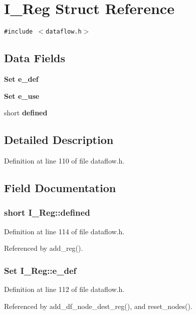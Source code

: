 \section{I\_\-Reg Struct Reference}
\label{structI__Reg}
{\tt \#include $<$dataflow.h$>$}

\subsection*{Data Fields}
\begin{CompactItemize}
\item 
\bf{Set} \bf{e\_\-def}
\item 
\bf{Set} \bf{e\_\-use}
\item 
short \bf{defined}
\end{CompactItemize}


\subsection{Detailed Description}




Definition at line 110 of file dataflow.h.

\subsection{Field Documentation}
\subsubsection{\setlength{\rightskip}{0pt plus 5cm}short \bf{I\_\-Reg::defined}}\label{structI__Reg_5c009d5ee89ae3c6f0c57344e4091b16}




Definition at line 114 of file dataflow.h.

Referenced by add\_\-reg().
\subsubsection{\setlength{\rightskip}{0pt plus 5cm}\bf{Set} \bf{I\_\-Reg::e\_\-def}}\label{structI__Reg_1ac186ebda0f78d461f08d93f2357b11}




Definition at line 112 of file dataflow.h.

Referenced by add\_\-df\_\-node\_\-dest\_\-reg(), and reset\_\-nodes().
